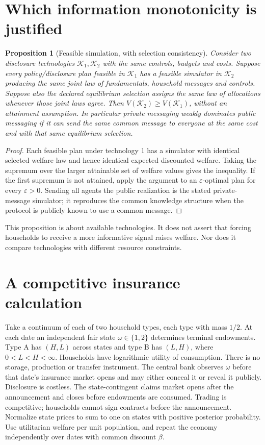 \documentclass[11pt]{article}
\newtheorem{proposition}[theorem]{Proposition}
\theoremstyle{remark}
\begin{document}
\section{Which information monotonicity is justified}
\begin{proposition}[Feasible simulation, with selection consistency]
Consider two disclosure technologies $\mathcal K_1,\mathcal K_2$ with
the same controls, budgets and costs. Suppose every policy/disclosure
plan feasible in $\mathcal K_1$ has a feasible simulator in
$\mathcal K_2$ producing the same joint law of fundamentals, household
messages and controls. Suppose also the declared equilibrium selection
assigns the same law of allocations whenever those joint laws agree.
Then $V(\mathcal K_2)\geq V(\mathcal K_1)$, without an attainment
assumption. In particular private messaging weakly dominates public
messaging if it can send the same common message to everyone at the same
cost and with that same equilibrium selection.
\end{proposition}
\begin{proof}
Each feasible plan under technology 1 has a simulator with identical
selected welfare law and hence identical expected discounted welfare.
Taking the supremum over the larger attainable set of welfare values
gives the inequality. If the first supremum is not attained, apply the
argument to an $\varepsilon$-optimal plan for every $\varepsilon>0$.
Sending all agents the public realization is the stated private-message
simulator; it reproduces the common knowledge structure when the
protocol is publicly known to use a common message.
\end{proof}

This proposition is about available technologies. It does not assert that
forcing households to receive a more informative signal raises welfare.
Nor does it compare technologies with different resource constraints.

\section{A competitive insurance calculation}
Take a continuum of each of two household types, each type with mass
$1/2$. At each date an independent fair state $\omega\in\{1,2\}$
determines terminal endowments. Type A has $(H,L)$ across states and type
B has $(L,H)$, where $0<L<H<\infty$. Households have logarithmic utility
of consumption. There is no storage, production or transfer instrument.
The central bank observes $\omega$ before that date's insurance market
opens and may either conceal it or reveal it publicly. Disclosure is
costless. The state-contingent claims market opens after the announcement
and closes before endowments are consumed. Trading is competitive;
households cannot sign contracts before the announcement. Normalize state
prices to sum to one on states with positive posterior probability.
Use utilitarian welfare per unit population, and repeat the economy
independently over dates with common discount $\beta$.
\end{document}
